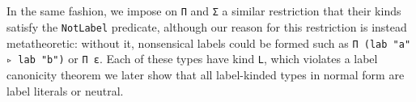 \documentclass[authoryear, acmsmall, screen, review, nonacm]{acmart} %
\begin{document}
\begin{code}%
\>[0]\AgdaSpace{}%
\AgdaSymbol{:}%
\>[613I]\AgdaSymbol{\{}\AgdaSpace{}%
\AgdaSpace{}%
\AgdaSymbol{:}\AgdaSpace{}%
\AgdaSpace{}%
\AgdaSpace{}%
\AgdaSpace{}%
\AgdaOperator{\AgdaInductiveConstructor{R[}}\AgdaSpace{}%
\AgdaSpace{}%
\AgdaOperator{\AgdaInductiveConstructor{]}}\AgdaSymbol{\}}\<%
\\
\>[.][@{}l@{}]\<[613I]%
\>[17]\AgdaSymbol{\{}\AgdaSpace{}%
\AgdaSymbol{:}\AgdaSpace{}%
\AgdaSpace{}%
\AgdaSymbol{(}\AgdaSpace{}%
\AgdaSymbol{)\}}\AgdaSpace{}%
\AgdaSymbol{\{}\AgdaSpace{}%
\AgdaSymbol{:}\AgdaSpace{}%
\AgdaSpace{}%
\AgdaSymbol{(}\AgdaSpace{}%
\AgdaSymbol{)\}}\AgdaSpace{}%
\<%
\\
%
\>[17]\AgdaSpace{}%
\AgdaSpace{}%
\AgdaSpace{}%
\AgdaSpace{}%
\AgdaSpace{}%
\AgdaSpace{}%
\AgdaSpace{}%
\AgdaSpace{}%
\AgdaSpace{}%
\AgdaSpace{}%
\AgdaSpace{}%
\AgdaSpace{}%
\<%
\\
\>[0]\AgdaSpace{}%
\AgdaSymbol{\{}\AgdaSpace{}%
\AgdaSymbol{=}\AgdaSpace{}%
\AgdaSymbol{\}}\AgdaSpace{}%
\AgdaSymbol{\{\AgdaUnderscore{}\}}\AgdaSpace{}%
\AgdaSymbol{\{}\AgdaSymbol{\}}\AgdaSpace{}%
\AgdaSymbol{\{}\AgdaSymbol{\}}\AgdaSpace{}%
\<%
\\
\>[0][@{}l@{\AgdaIndent{0}}]%
\>[2]\AgdaSpace{}%
\AgdaSpace{}%
\AgdaSymbol{(}\AgdaSpace{}%
\AgdaSymbol{)}\AgdaSpace{}%
\AgdaSymbol{(}\AgdaSpace{}%
\AgdaSymbol{)}\AgdaSpace{}%
\AgdaSpace{}%
\AgdaSpace{}%
\AgdaSymbol{=}\AgdaSpace{}%
\<%
\end{code} 

In the same fashion, we impose on \verb!Π! and \verb!Σ! a similar restriction that their kinds satisfy the \verb!NotLabel! predicate, although our reason for this restriction is instead metatheoretic: without it, nonsensical labels could be formed such as \verb!Π (lab "a" ▹ lab "b")! or \verb!Π ε!. Each of these types have kind \verb!L!, which violates a label canonicity theorem we later show that all label-kinded types in normal form are label literals or neutral.
\end{document}
